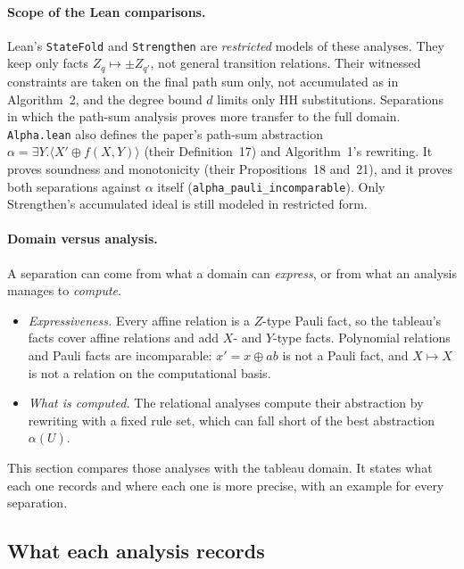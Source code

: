 \documentclass[11pt]{article}
\theoremstyle{definition}
\theoremstyle{remark}
\begin{document}
\paragraph{Scope of the Lean comparisons.}
Lean's \texttt{StateFold} and \texttt{Strengthen} are \emph{restricted} models of these
analyses. They keep only facts $Z_q \mapsto \pm Z_{q'}$, not general transition relations.
Their witnessed constraints are taken on the final path sum only, not accumulated as in
Algorithm~2, and the degree bound $d$ limits only HH substitutions. Separations in which the
path-sum analysis proves more transfer to the full domain. \texttt{Alpha.lean} also defines
the paper's path-sum abstraction $\alpha = \exists Y.\langle X' \oplus f(X,Y)\rangle$
(their Definition~17) and Algorithm~1's rewriting. It proves soundness and monotonicity
(their Propositions~18 and~21), and it proves both separations against $\alpha$ itself
(\texttt{alpha\_pauli\_incomparable}). Only Strengthen's accumulated ideal is still
modeled in restricted form.

\paragraph{Domain versus analysis.}
A separation can come from what a domain can \emph{express}, or from what an analysis
manages to \emph{compute}.
\begin{itemize}[nosep]
  \item \emph{Expressiveness.} Every affine relation is a $Z$-type Pauli fact, so the
  tableau's facts cover affine relations and add $X$- and $Y$-type facts. Polynomial
  relations and Pauli facts are incomparable: $x' = x \oplus ab$ is not a Pauli fact, and
  $X \mapsto X$ is not a relation on the computational basis.
  \item \emph{What is computed.} The relational analyses compute their abstraction by
  rewriting with a fixed rule set, which can fall short of the best abstraction
  $\alpha(U)$.
\end{itemize} This section compares those analyses with the tableau domain. It
states what each one records and where each one is more precise, with an example for
every separation.

\subsection{What each analysis records}
\end{document}
